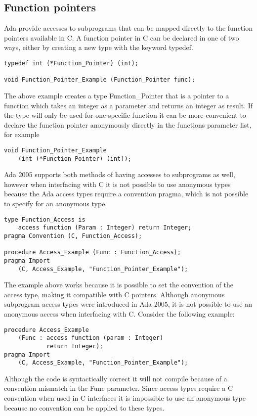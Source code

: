 \subsection{Function pointers}
Ada provide accesses to subprograms that can be mapped directly to the function pointers available in C. A function pointer in C can be declared in one of two ways, either by creating a new type with the keyword typedef.
\begin{lstlisting}
typedef int (*Function_Pointer) (int);

void Function_Pointer_Example (Function_Pointer func);
\end{lstlisting}
The above example creates a type Function_Pointer that is a pointer to a function which takes an integer as a parameter and returns an integer as result. If the type will only be used for one specific function it can be more convenient to declare the function pointer anonymously directly in the functions parameter list, for example
\begin{lstlisting}
void Function_Pointer_Example 
	(int (*Function_Pointer) (int));
\end{lstlisting}
Ada 2005 supports both methods of having accesses to subprograms as well, however when interfacing with C it is not possible to use anonymous types because the Ada access types require a convention pragma, which is not possible to specify for an anonymous type.
\begin{lstlisting}
type Function_Access is 
	access function (Param : Integer) return Integer;
pragma Convention (C, Function_Access);

procedure Access_Example (Func : Function_Access);
pragma Import 
	(C, Access_Example, "Function_Pointer_Example");
\end{lstlisting}
The example above works because it is possible to set the convention of the access type, making it compatible with C pointers.
Although anonymous subprogram access types were introduced in Ada 2005, it is not possible to use an anonymous access when interfacing with C. Consider the following example:
\begin{lstlisting}
procedure Access_Example 
	(Func : access function (param : Integer) 
			return Integer);
pragma Import 
	(C, Access_Example, "Function_Pointer_Example");
\end{lstlisting}
Although the code is syntactically correct it will not compile because of a convention mismatch in the Func parameter. Since access types require a C convention when used in C interfaces it is impossible to use an anonymous type because no convention can be applied to these types.
